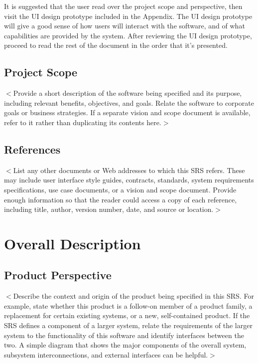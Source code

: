 \documentclass{scrreprt}
\begin{document}
It is suggested that the user read over the project scope and perspective, then
visit the UI design prototype included in the Appendix. The UI design prototype 
will give a good sense of how users will interact with the software, and of what
capabilities are provided by the system. After reviewing the UI design prototype,
proceed to read the rest of the document in the order that it's presented.

\section{Project Scope}
$<$Provide a short description of the software being specified and its purpose, 
including relevant benefits, objectives, and goals. Relate the software to 
corporate goals or business strategies. If a separate vision and scope document 
is available, refer to it rather than duplicating its contents here.$>$

\section{References}
$<$List any other documents or Web addresses to which this SRS refers. These may 
include user interface style guides, contracts, standards, system requirements 
specifications, use case documents, or a vision and scope document. Provide 
enough information so that the reader could access a copy of each reference, 
including title, author, version number, date, and source or location.$>$


\chapter{Overall Description}

\section{Product Perspective}
$<$Describe the context and origin of the product being specified in this SRS.  
For example, state whether this product is a follow-on member of a product 
family, a replacement for certain existing systems, or a new, self-contained 
product. If the SRS defines a component of a larger system, relate the 
requirements of the larger system to the functionality of this software and 
identify interfaces between the two. A simple diagram that shows the major 
components of the overall system, subsystem interconnections, and external 
interfaces can be helpful.$>$
\end{document}
